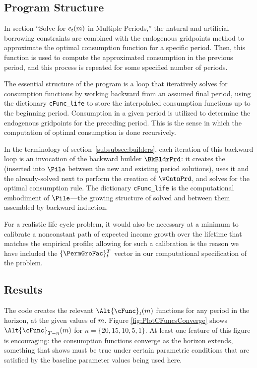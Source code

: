 \subsection{Program Structure}

In section ``Solve for $c_t(m)$ in Multiple Periods,'' the natural and artificial borrowing constraints are combined with the endogenous gridpoints method to approximate the optimal consumption function for a specific period. Then, this function is used to compute the approximated consumption in the previous period, and this process is repeated for some specified number of periods.

The essential structure of the program is a loop that iteratively solves for consumption functions by working backward from an assumed final period, using the dictionary \texttt{cFunc\_life} to store the interpolated consumption functions up to the beginning period. Consumption in a given period is utilized to determine the endogenous gridpoints for the preceding period. This is the sense in which the computation of optimal consumption is done recursively.

In the terminology of section~\ref{subsubsec:builders}, each iteration of this backward loop is an invocation of the backward builder $\BkBldrPrd$: it creates the {\Cnct} (inserted into $\Pile$ between the new and existing period solutions), uses it and the already-solved next {\interval} to perform the creation of $\vCntnPrd$, and solves for the optimal consumption rule.  The dictionary \texttt{cFunc\_life} is the computational embodiment of $\Pile$---the growing structure of solved {\intervals} and {\Cncts} between them assembled by backward induction.

For a realistic life cycle problem, it would also be necessary at a
minimum to calibrate a nonconstant path of expected income growth over the
lifetime that matches the empirical profile; allowing for such
a calibration is the reason we have included the $\{\PermGroFac\}_{\prdt}^{T}$
vector in our computational specification of the problem.

\hypertarget{results}{}
\subsection{Results}

The code creates the relevant $\Alt{\cFunc}_{\prdt}(\mNrm)$ functions for any period in the horizon, at the given values of $m$.  Figure \ref{fig:PlotCFuncsConverge} shows $\Alt{\cFunc}_{T-n}(m)$ for $n=\{20,15,10,5,1\}$.  At least one feature of this figure is encouraging: the consumption functions converge as the horizon extends, something that \cite{BufferStockTheory} shows must be true under certain parametric conditions that are satisfied by the baseline parameter values being used here.

